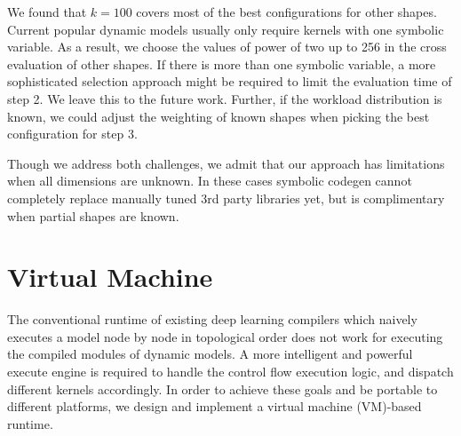 We found that $k=100$ covers most of the best configurations for other shapes. Current popular dynamic models usually only require kernels with one symbolic variable. As a result, we choose the values of power of two up to 256 in the cross evaluation of other shapes. If there is more than one symbolic variable, a more sophisticated selection approach might be required to limit the evaluation time of step 2. We leave this to the future work. Further, if the workload distribution is known, we could adjust the weighting of known shapes when picking the best configuration for step 3.

Though we address both challenges, we admit that our approach has limitations when all dimensions are unknown. In these cases symbolic codegen cannot completely replace manually tuned 3rd party libraries yet, but is complimentary when partial shapes are known.





\section{Virtual Machine}
\label{sec:runtime}
The conventional runtime of existing deep learning compilers which naively executes a model node by node in topological order does not work for executing the compiled modules of dynamic models. A more intelligent and powerful execute engine is required to handle the control flow execution logic, and dispatch different kernels accordingly. In order to achieve these goals and be portable to different platforms, we design and implement a virtual machine (VM)-based runtime.

